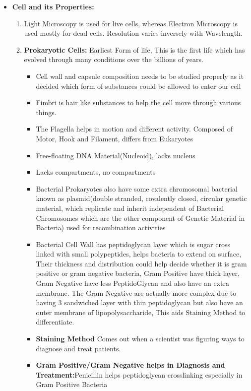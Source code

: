 \documentclass{article}
\begin{document}
\begin{itemize}
    \item \textbf{Cell and its Properties:}
     \begin{enumerate}
         \item Light Microscopy is used for live cells, whereas Electron Microscopy is used mostly for dead cells. Resolution varies inversely with Wavelength.
         \item \textbf{Prokaryotic Cells:} Earliest Form of life, This is the first life which has evolved through many conditions over the billions of years.
         \begin{itemize}
             \item Cell wall and capsule composition needs to be studied properly as it decided which form of substances could be allowed to enter our cell
             \item Fimbri is hair like substances to help the cell move through various things.
             \item The Flagella helps in motion and different activity. Composed of Motor, Hook and Filament, differs from Eukaryotes
             \item Free-floating DNA Material(Nucleoid), lacks nucleus
             \item Lacks compartments, no compartments
             \item Bacterial Prokaryotes also have some extra chromosomal bacterial known as plasmid(double stranded, covalently closed, circular genetic material, which replicate and inherit independent of Bacterial Chromosomes which are the other component of Genetic Material in Bacteria) used for recombination activities
             \item Bacterial Cell Wall has peptidoglycan layer which is sugar cross linked with small polypeptides, helps bacteria to extend on surface, Their thickness and distribution could help decide whether it is gram positive or gram negative bacteria, Gram Positive have thick layer, Gram Negative have less PeptidoGlycan and also have an extra membrane. The Gram Negative are actually more complex due to  having 3 sandwiched layer with thin peptidoglycan but also have an outer membrane of lipopolysaccharide, This aids Staining Method to differentiate.
             \item \textbf{Staining Method} Comes out when a scientist was figuring ways to diagnose and treat patients.
             \item \textbf{Gram Positive/Gram Negative helps in Diagnosis and Treatment:}Penicillin helps peptidoglycan crosslinking especially in Gram Positive Bacteria


\end{itemize}
\end{enumerate}
\end{itemize}
\end{document}
